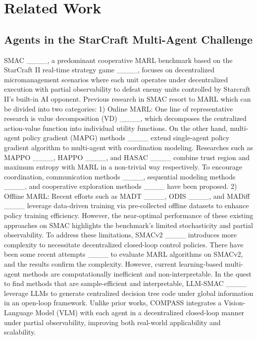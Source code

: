 \section{Related Work}
\label{related work}
\subsection{Agents in the StarCraft Multi-Agent Challenge}
SMAC ____, a predominant cooperative MARL benchmark based on the StarCraft II real-time strategy game ____, focuses on decentralized micromanagement scenarios where each unit operates under decentralized execution with partial observability to defeat enemy units controlled by Starcraft II’s built-in AI opponent. Previous research in SMAC resort to MARL which can be divided into two categories: 1) Online MARL: One line of representative research is value decomposition (VD) ____, which decomposes the centralized action-value function into individual utility functions. On the other hand, multi-agent policy gradient (MAPG) methods ____ extend single-agent policy gradient algorithm to multi-agent with coordination modeling. Researches such as MAPPO ____, HAPPO ____, and HASAC ____ combine trust region and maximum entropy with MARL in a non-trivial way respectively. To encourage coordination, communication methods ____, sequential modeling methods ____, and cooperative exploration methods ____ have been proposed. 2) Offline MARL: Recent efforts such as MADT ____, ODIS ____, and MADiff ____ leverage data-driven training via pre-collected offline datasets to enhance policy training efficiency. However, the near-optimal performance of these existing approaches on SMAC highlights the benchmark's limited stochasticity and partial observability. To address these limitations, SMACv2 ____ introduces more complexity to necessitate decentralized closed-loop control policies. There have been some recent attempts ____ to evaluate MARL algorithms on SMACv2, and the results confirm the complexity. However, current learning-based multi-agent methods are computationally inefficient and non-interpretable. In the quest to find methods that are sample-efficient and interpretable, LLM-SMAC ____ leverage LLMs to generate centralized decision tree code under global information in an open-loop framework. Unlike prior works, COMPASS integrates a Vision-Language Model (VLM) with each agent in a decentralized closed-loop manner under partial observability, improving both real-world applicability and scalability.

